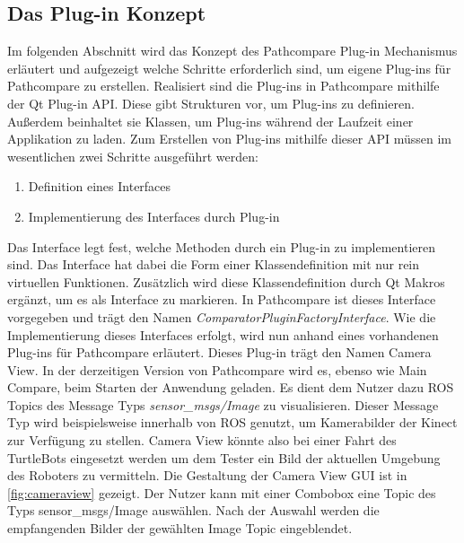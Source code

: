 \subsection{Das Plug-in Konzept}

Im folgenden Abschnitt wird das Konzept des Pathcompare Plug-in Mechanismus
erläutert und aufgezeigt welche Schritte erforderlich sind, um eigene Plug-ins
für Pathcompare zu erstellen. Realisiert sind die Plug-ins in Pathcompare
mithilfe der Qt Plug-in API. Diese gibt Strukturen vor, um Plug-ins zu
definieren. Außerdem beinhaltet sie Klassen, um Plug-ins während der Laufzeit
einer Applikation zu laden.  Zum Erstellen von Plug-ins mithilfe dieser API
müssen im wesentlichen zwei Schritte ausgeführt werden:

\begin{enumerate}
  \item Definition eines Interfaces
  \item Implementierung des Interfaces durch Plug-in
\end{enumerate}

Das Interface legt fest, welche
Methoden durch ein Plug-in zu implementieren sind. Das Interface hat dabei die
Form einer Klassendefinition mit nur rein virtuellen Funktionen. Zusätzlich
wird diese Klassendefinition durch Qt Makros ergänzt, um es als Interface zu
markieren. In Pathcompare ist dieses Interface vorgegeben und trägt den Namen
\textit{ComparatorPluginFactoryInterface}. Wie die Implementierung dieses
Interfaces erfolgt, wird nun anhand eines vorhandenen Plug-ins für Pathcompare
erläutert. Dieses Plug-in trägt den Namen Camera View. In der derzeitigen
Version von Pathcompare wird es, ebenso wie Main Compare, beim Starten der
Anwendung geladen. Es dient dem Nutzer dazu ROS Topics des Message Typs
\textit{sensor\_msgs/Image} zu visualisieren. Dieser Message Typ wird
beispielsweise innerhalb von ROS genutzt, um Kamerabilder der Kinect zur
Verfügung zu stellen.  Camera View könnte also bei einer Fahrt des TurtleBots
eingesetzt werden um dem Tester ein Bild der aktuellen Umgebung des Roboters zu
vermitteln. Die Gestaltung der Camera View GUI ist in \autoref{fig:cameraview}
gezeigt.  Der Nutzer kann mit einer Combobox eine Topic des Typs
sensor\_msgs/Image auswählen. Nach der Auswahl werden die empfangenden Bilder
der gewählten Image Topic eingeblendet. 

